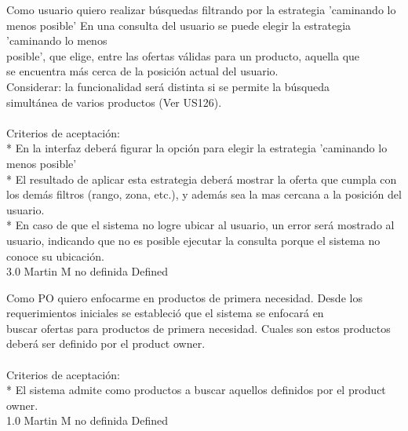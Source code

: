 \vspace{20pt}

	{Como usuario quiero realizar búsquedas filtrando por la estrategia 'caminando lo menos posible'} %
	{En una consulta del usuario se puede elegir la estrategia 'caminando lo menos\\
posible', que elige, entre las ofertas válidas para un producto, aquella que\\
se encuentra más cerca de la posición actual del usuario.\\
Considerar: la funcionalidad será distinta si se permite la búsqueda\\
simultánea de varios productos (Ver US126).\\
  \\
Criterios de aceptación:\\
* En la interfaz deberá figurar la opción para elegir la estrategia 'caminando lo menos posible'\\
* El resultado de aplicar esta estrategia deberá mostrar la oferta que cumpla con los demás filtros (rango, zona, etc.), y además sea la mas cercana a la posición del usuario.\\
* En caso de que el sistema no logre ubicar al usuario, un error será mostrado al usuario, indicando que no es posible ejecutar la consulta porque el sistema no conoce su ubicación.\\
} %
	{} %
	{3.0} %
	{Martin M} %
	{no definida} %
	{Defined} %


\vspace{20pt}

	{Como PO quiero enfocarme en productos de primera necesidad.} %
	{Desde los requerimientos iniciales se estableció que el sistema se enfocará en\\
buscar ofertas para productos de primera necesidad. Cuales son estos productos\\
deberá ser definido por el product owner.\\
  \\
Criterios de aceptación:\\
* El sistema admite como productos a buscar aquellos definidos por el product owner.\\
} %
	{} %
	{1.0} %
	{Martin M} %
	{no definida} %
	{Defined} %

